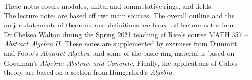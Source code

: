\documentclass{memoir}
\begin{document}


These notes covers modules, unital and commutative rings, and fields.\\

The lecture notes are based off two main sources. The overall outline and the major statements of theorems and definitions are based off lecture notes from Dr.\@ Chelsea Walton during the Spring 2021 teaching of Rice's course MATH 357 -- \textit{Abstract Algebra II}. These notes are supplemented by exercises from Dummitt and Foote's \textit{Abstract Algebra}, and some of the basic ring material is based on Goodman's \textit{Algebra: Abstract and Concrete}. Finally, the applications of Galois theory are based on a section from Hungerford's \textit{Algebra}.
\end{document}
